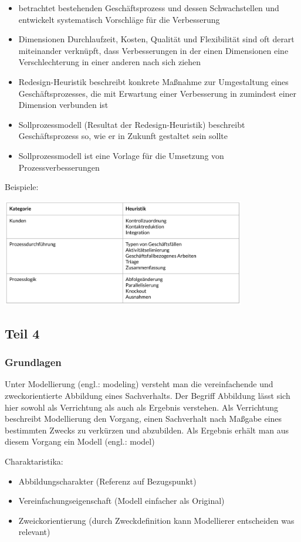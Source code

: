 \begin{itemize}
  \item betrachtet bestehenden Geschäftsprozess und dessen Schwachstellen und entwickelt systematisch Vorschläge für die Verbesserung
  \item Dimensionen Durchlaufzeit, Kosten, Qualität und Flexibilität sind oft derart miteinander verknüpft, dass Verbesserungen in der einen Dimensionen eine Verschlechterung in einer anderen nach sich ziehen
  \item Redesign-Heuristik beschreibt konkrete Maßnahme zur Umgestaltung eines Geschäftsprozesses, die mit Erwartung einer Verbesserung in zumindest einer Dimension verbunden ist
  \item Sollprozessmodell (Resultat der Redesign-Heuristik) beschreibt Geschäftsprozess so, wie er in Zukunft gestaltet sein sollte
  \item Sollprozessmodell ist eine Vorlage für die Umsetzung von Prozessverbesserungen 
\end{itemize}
Beispiele: 
\par
\includegraphics[width=0.8\textwidth]{assets/BeispieleHeuristiken.PNG}

\subsection{Teil 4}
\subsubsection{Grundlagen}

Unter Modellierung (engl.: modeling) versteht man die vereinfachende und zweckorientierte Abbildung eines Sachverhalts. Der Begriff Abbildung lässt sich hier sowohl als Verrichtung als auch als Ergebnis verstehen. Als Verrichtung beschreibt Modellierung den Vorgang, einen Sachverhalt nach Maßgabe eines bestimmten Zwecks zu verkürzen und abzubilden. Als Ergebnis erhält man aus diesem Vorgang ein Modell (engl.: model)
\par
Charaktaristika:
\begin{itemize}
 \item Abbildungscharakter (Referenz auf Bezugspunkt)
 \item Vereinfachungseigenschaft (Modell einfacher als Original) 
 \item Zweickorientierung (durch Zweckdefinition kann Modellierer entscheiden was relevant)
\end{itemize}

